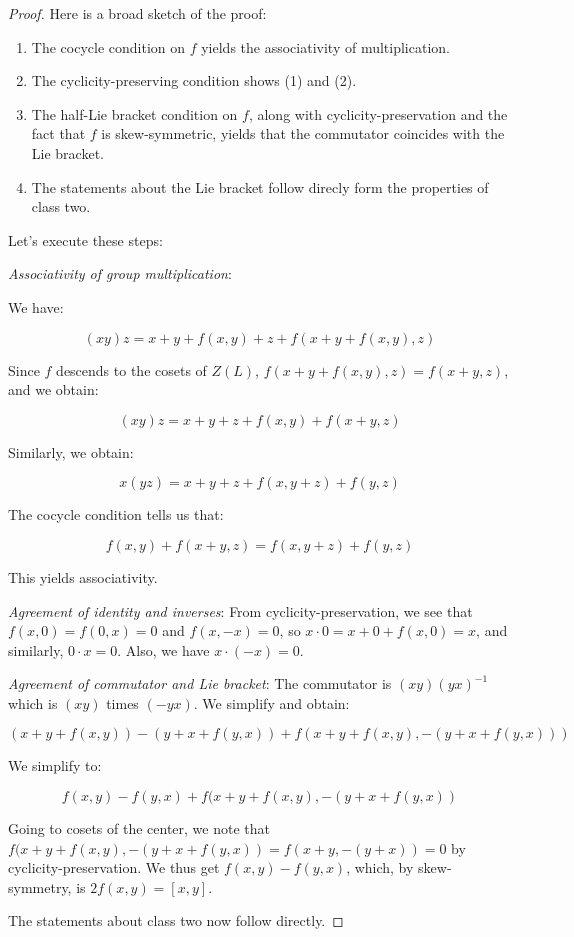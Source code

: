 \documentclass[10pt]{amsart}
\begin{document}
\begin{proof}
  Here is a broad sketch of the proof:
  \begin{enumerate}
  \item The cocycle condition on $f$ yields the associativity of
    multiplication.
  \item The cyclicity-preserving condition shows (1) and (2).
  \item The half-Lie bracket condition on $f$, along with
    cyclicity-preservation and the fact that $f$ is skew-symmetric,
    yields that the commutator coincides with the Lie bracket.
  \item The statements about the Lie bracket follow direcly form the
    properties of class two.
  \end{enumerate}

  Let's execute these steps:

  {\em Associativity of group multiplication}:

  We have:

  $$(xy)z = x + y + f(x,y) + z + f(x + y + f(x,y),z)$$

  Since $f$ descends to the cosets of $Z(L)$, $f(x + y + f(x,y),z) =
  f(x + y,z)$, and we obtain:

  $$(xy)z = x + y + z + f(x,y) + f(x + y,z)$$

  Similarly, we obtain:

  $$x(yz) = x + y + z + f(x,y + z) + f(y,z)$$

  The cocycle condition tells us that:

  $$f(x,y) + f(x + y,z) = f(x,y + z) + f(y,z)$$

  This yields associativity.

  {\em Agreement of identity and inverses}: From
  cyclicity-preservation, we see that $f(x,0) = f(0,x) = 0$ and
  $f(x,-x) = 0$, so $x\cdot 0 = x + 0 + f(x,0) = x$, and similarly, $0
  \cdot x = 0$. Also, we have $x \cdot (-x) = 0$.

  {\em Agreement of commutator and Lie bracket}: The commutator is
  $(xy)(yx)^{-1}$ which is $(xy)$ times $(-yx)$. We simplify and obtain:

  $$(x + y + f(x,y)) - (y + x + f(y,x)) + f(x + y + f(x,y),-(y + x + f(y,x)))$$

  We simplify to:

  $$f(x,y) - f(y,x) + f(x + y + f(x,y),-(y + x + f(y,x))$$

  Going to cosets of the center, we note that $f(x + y + f(x,y),-(y +
  x + f(y,x)) = f(x + y, -(y + x)) = 0$ by cyclicity-preservation. We
  thus get $f(x,y) - f(y,x)$, which, by skew-symmetry, is $2f(x,y) =
  [x,y]$.

  The statements about class two now follow directly.

\end{proof}
\end{document}
